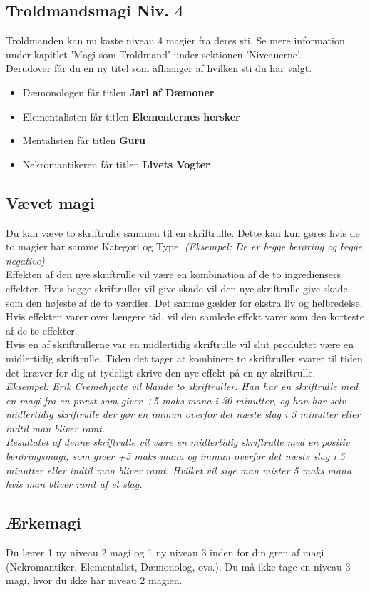 \subsection{Troldmandsmagi Niv. 4}
Troldmanden kan nu kaste niveau 4 magier fra deres sti. Se mere information under kapitlet 'Magi som Troldmand' under sektionen 'Niveauerne'. \\
Derudover får du en ny titel som afhænger af hvilken sti du har valgt.\\
\begin{itemize}
    \item Dæmonologen får titlen \textbf{Jarl af Dæmoner}
    \item Elementalisten får titlen \textbf{Elementernes hersker}
    \item Mentalisten får titlen \textbf{Guru}
    \item Nekromantikeren får titlen \textbf{Livets Vogter}
\end{itemize}

\subsection{Vævet magi}
Du kan væve to skriftrulle sammen til en skriftrulle. Dette kan kun gøres hvis de to magier har samme Kategori og Type. \textit{(Eksempel: De er begge berøring og begge negative)}\\
Effekten af den nye skriftrulle vil være en kombination af de to ingrediensers effekter. Hvis begge skriftruller vil give skade vil den nye skriftrulle give skade som den højeste af de to værdier. Det samme gælder for ekstra liv og helbredelse. Hvis effekten varer over længere tid, vil den samlede effekt varer som den korteste af de to effekter.\\
Hvis en af skriftrullerne var en midlertidig skriftrulle vil slut produktet være en midlertidig skriftrulle.
Tiden det tager at kombinere to skriftruller svarer til tiden det kræver for dig at tydeligt skrive den nye effekt på en ny skriftrulle.\\
\textit{Eksempel: Erik Cremehjerte vil blande to skriftruller. Han har en skriftrulle med en magi fra en præst som giver +5 maks mana i 30 minutter, og han har selv midlertidig skriftrulle der gør en immun overfor det næste slag i 5 minutter eller indtil man bliver ramt.\\
Resultatet af denne skriftrulle vil være en midlertidig skriftrulle med en positiv berøringsmagi, som giver +5 maks mana og immun overfor det næste slag i 5 minutter eller indtil man bliver ramt. Hvilket vil sige man mister 5 maks mana hvis man bliver ramt af et slag.}

\subsection{Ærkemagi}
Du lærer 1 ny niveau 2 magi og 1 ny niveau 3 inden for din gren af magi (Nekromantiker, Elementalist, Dæmonolog, ovs.). Du må ikke tage en niveau 3 magi, hvor du ikke har niveau 2 magien.